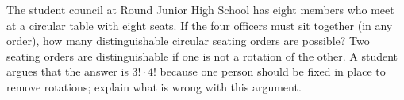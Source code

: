 The student council at Round Junior High School has eight members who meet at a circular table with eight seats. If the four officers must sit together (in any order), how many distinguishable circular seating orders are possible? Two seating orders are distinguishable if one is not a rotation of the other. A student argues that the answer is $3!\cdot4!$ because one person should be fixed in place to remove rotations; explain what is wrong with this argument.
